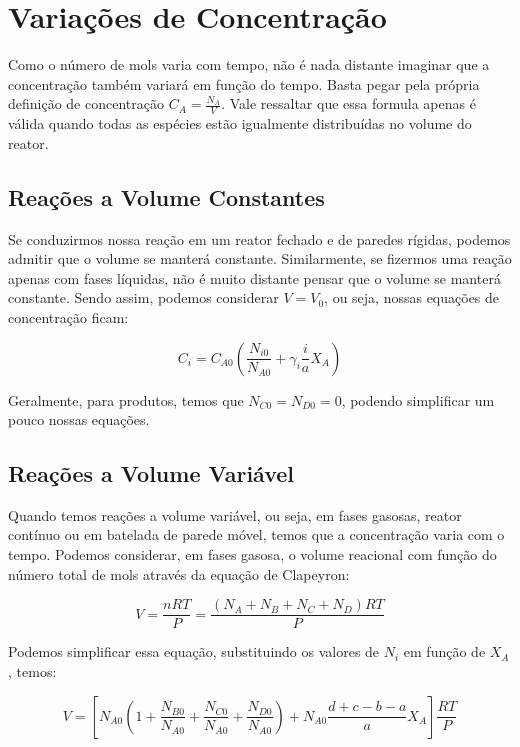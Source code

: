 \section{Variações de Concentração}
Como o número de mols varia com tempo, não é nada distante imaginar que a concentração também
variará em função do tempo. Basta pegar pela própria definição de concentração \(C_A =
\frac{N_A}{V}\). Vale ressaltar que essa formula apenas é válida quando todas as espécies estão
igualmente distribuídas no volume do reator. \par

\subsection{Reações a Volume Constantes}  
Se conduzirmos nossa reação em um reator fechado e de paredes rígidas, podemos admitir que o volume
se manterá constante. Similarmente, se fizermos uma reação apenas com fases líquidas, não é muito
distante pensar que o volume se manterá constante. Sendo assim, podemos considerar \(V = V_0\), ou
seja, nossas equações de concentração ficam:

\begin{equation}\label{eq:cap3_concentracao_volume_fixo}
    C_i = C_{A0} \left( \frac{N_{i0}}{N_{A0} } + \gamma_i \frac{i}{a}X_A \right)  
\end{equation}

Geralmente, para produtos, temos que \(N_{C0} = N_{D0} = 0 \), podendo simplificar um pouco nossas
equações. 

\subsection{Reações a Volume Variável}
Quando temos reações a volume variável, ou seja, em fases gasosas, reator contínuo ou em batelada de
parede móvel, temos que a concentração varia com o tempo. Podemos considerar, em fases gasosa, o
volume reacional com função do número  total de mols através da equação de Clapeyron:

\begin{equation}
    V = \frac{n R T}{P} = \frac{\left( N_A + N_B + N_C + N_D \right) RT}{P}
\end{equation}

Podemos simplificar essa equação, substituindo os valores de \(N_i\) em função de \(X_A\), temos:

\begin{equation}
    V = \left[N_{A0} \left( 1 + \frac{N_{B0} }{N_{A0}} + \frac{N_{C0} }{N_{A0}} + \frac{N_{D0} }{N_{A0}}\right) + N_{A0}\frac{d+c-b-a}{a}X_A \right] \frac{RT}{P}
\end{equation}

